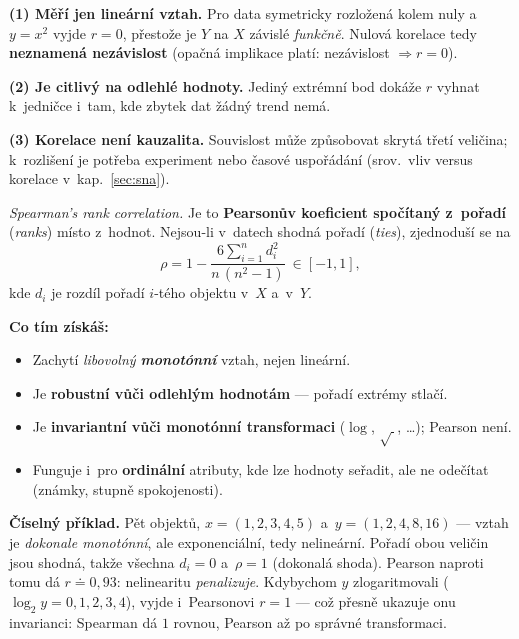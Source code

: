 \documentclass[11pt,a4paper]{article}
\theoremstyle{definition}
\begin{document}
\begin{poznbox}
\textbf{(1) Měří jen lineární vztah.} Pro data symetricky rozložená kolem nuly a~$y=x^2$
vyjde $r=0$, přestože je $Y$ na $X$ závislé \emph{funkčně}. Nulová korelace tedy
\textbf{neznamená nezávislost} (opačná implikace platí: nezávislost $\Rightarrow r=0$).

\textbf{(2) Je citlivý na odlehlé hodnoty.} Jediný extrémní bod dokáže $r$ vyhnat k~jedničce
i~tam, kde zbytek dat žádný trend nemá.

\textbf{(3) Korelace není kauzalita.} Souvislost může způsobovat skrytá třetí veličina;
k~rozlišení je potřeba experiment nebo časové uspořádání (srov.\ vliv versus korelace
v~kap.~\ref{sec:sna}).
\end{poznbox}

\begin{defbox}
\emph{Spearman's rank correlation.} Je to \textbf{Pearsonův koeficient spočítaný z~pořadí}
(\emph{ranks}) místo z~hodnot. Nejsou-li v~datech shodná pořadí (\emph{ties}), zjednoduší se na
\[ \rho = 1-\frac{6\sum_{i=1}^{n} d_i^2}{n\,(n^2-1)}\ \in[-1,1], \]
kde $d_i$ je rozdíl pořadí $i$-tého objektu v~$X$ a~v~$Y$.

\textbf{Co tím získáš:}
\begin{itemize}
\item Zachytí \emph{libovolný \textbf{monotónní}} vztah, nejen lineární.
\item Je \textbf{robustní vůči odlehlým hodnotám} --- pořadí extrémy stlačí.
\item Je \textbf{invariantní vůči monotónní transformaci} ($\log$, $\sqrt{\ }$, \dots);
      Pearson není.
\item Funguje i~pro \textbf{ordinální} atributy, kde lze hodnoty seřadit, ale ne odečítat
      (známky, stupně spokojenosti).
\end{itemize}
\end{defbox}

\textbf{Číselný příklad.} Pět objektů, $x=(1,2,3,4,5)$ a~$y=(1,2,4,8,16)$ --- vztah je
\emph{dokonale monotónní}, ale exponenciální, tedy nelineární.
Pořadí obou veličin jsou shodná, takže všechna $d_i=0$ a~$\rho=1$ (dokonalá shoda).
Pearson naproti tomu dá $r\doteq 0{,}93$: nelinearitu \emph{penalizuje}.
Kdybychom $y$ zlogaritmovali ($\log_2 y = 0,1,2,3,4$), vyjde i~Pearsonovi $r=1$ --- což přesně
ukazuje onu invarianci: Spearman dá $1$ rovnou, Pearson až po správné transformaci.
\end{document}
